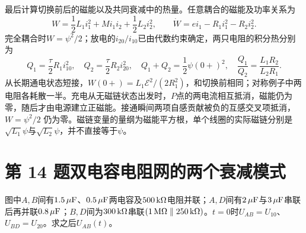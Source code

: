 \documentclass[UTF8,fontset=fandol,a4paper,11pt]{ctexart}
\begin{document}
最后计算切换前后的磁能以及共同衰减中的热量。任意耦合的磁能及功率关系为
\[
W=\frac12L_1i_1^2+Mi_1i_2+\frac12L_2i_2^2,\qquad
\dot W=e i_1-R_1i_1^2-R_2i_2^2.
\]
完全耦合时$W=\psi^2/2$；放电的$i_{20}/i_{10}$已由代数约束确定，两只电阻的积分热分别为
\[
Q_1=\frac\tau2R_1i_{10}^2,\quad Q_2=\frac\tau2R_2i_{20}^2,\quad
Q_1+Q_2=\frac12\psi(0+)^2,\quad
\frac{Q_1}{Q_2}=\frac{L_1R_2}{L_2R_1}.
\]
从长期通电状态短接，$W(0+)=L_1\mathcal E^2/(2R_1^2)$，和切换前相同；对称例子中两电阻各耗散一半。充电从无磁链状态出发时，$P$点的两电流相互抵消，磁能仍为零，随后才由电源建立正磁能。接通瞬间两项自感贡献被负的互感交叉项抵消，$W=\psi^2/2$ 仍为零。磁链变量的量纲为磁能平方根，单个线圈的实际磁链分别是$\sqrt{L_1}\psi$与$\sqrt{L_2}\psi$，并不直接等于$\psi$。




\section*{第 14 题\quad 双电容电阻网的两个衰减模式}\label{q:14}


图中$A,B$间有$1.5\,\mu{\rm F}$、$0.5\,\mu{\rm F}$两电容及$500\,{\rm k}\Omega$电阻并联；$A,D$间有$2\,\mu{\rm F}$与$3\,\mu{\rm F}$串联后再并联$0.8\,\mu{\rm F}$；$B,D$间为$300\,{\rm k}\Omega$串联$(1\,{\rm M}\Omega\parallel250\,{\rm k}\Omega)$。$t=0$时$U_{AB}=U_{10}$、$U_{BD}=U_{20}$。求之后$U_{AB}(t)$。
\end{document}
